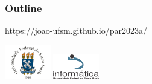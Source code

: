\documentclass[xcolor={usenames,dvipsnames},10pt,compress]{beamer}
\title[\titulo]{\titulo}
\subtitle{\disciplina}
\author[João V. F. Lima]{\nome}
\institute[UFSM]{Universidade Federal de Santa Maria \\ \url{jvlima@inf.ufsm.br} \\ \url{http://www.inf.ufsm.br/~jvlima}}
\date{2023/1}
\begin{document}
\begin{frame}
  \maketitle
\end{frame}

\begin{frame}
    \frametitle{Outline}
    \tableofcontents[hideallsubsections]
\end{frame}


%
%


%
%
%
%

\begin{frame}[plain]{}
  \begin{center}
    \vspace{2cm}
    \Large{https://joao-ufsm.github.io/par2023a/}
    
    \vspace{1cm}
    \includegraphics[width=2cm]{logo_ufsm}
    \hspace{0.5cm}
    \includegraphics[width=2cm]{logo_inf}
  \end{center}
\end{frame}
\end{document}
